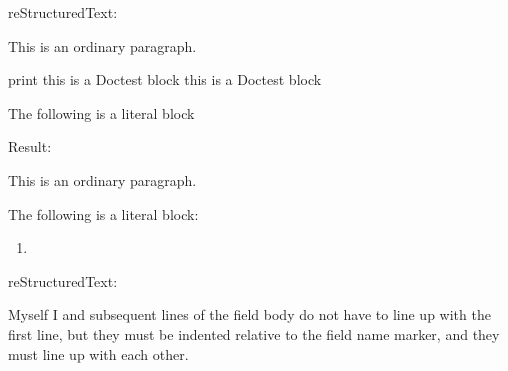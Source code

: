 \documentclass[letterpaper,11pt,english]{sphinxmanual}
\begin{document}
reStructuredText:

\begin{sphinxVerbatim}[commandchars=\\\{\}]
This is an ordinary paragraph.

\PYGZgt{}\PYGZgt{}\PYGZgt{} print \PYGZsq{}this is a Doctest block\PYGZsq{}
this is a Doctest block

The following is a literal block

\end{sphinxVerbatim}

Result:

This is an ordinary paragraph.

\begin{sphinxVerbatim}[commandchars=\\\{\}]
 
\end{sphinxVerbatim}

The following is a literal block:

\begin{sphinxVerbatim}[commandchars=\\\{\}]
        
\end{sphinxVerbatim}
\begin{enumerate}
\def\theenumi{\arabic{enumi}}
\def\labelenumi{\theenumi .}
\makeatletter\def\p@enumii{\p@enumi \theenumi .}\makeatother
\setcounter{enumi}{2}
\item {} 

\end{enumerate}

reStructuredText:

\begin{sphinxVerbatim}[commandchars=\\\{\}]
 
 
 
           Myself
           I
 
   and subsequent lines of the field body do not have to line up
   with the first line, but they must be indented relative to the
   field name marker, and they must line up with each other.
 
\end{sphinxVerbatim}
\end{document}
